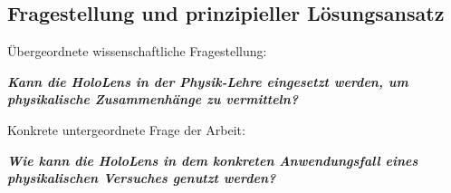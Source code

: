 \begin{comment}
Nicht zuletzt durch leistungsstärkere Hardware und Fortschritte im Bereich der künstlichen Intelligenz haben Augemented und Virtual Reality in den letzten Jahren an Bedeutung gewonnen.
\\
Physikalische Experimente durch virtuelle Darstellungen anzureichern und so besser und intuitiver verständlich zu machen, ist kein völlig neuer Ansatz. So stellen Strzys et. al. eine Anwendung mit der HoloLens im Bereich der Thermodynamik vor, bei der das gemessene Wärmeprofil eines erhitzten Metallstabes virtuell mit Hilfe der HoloLens auf den Stab gelegt wird \cite{Strzys17}. Und Buchau et. al. präsentieren eine Lösung, die unter anderem das Magnetfeld zweier Helmholtz-Spulen in das Echtzeitbild der Webcam zeichnet \cite{Buchau09}.\\ 
\end{comment}

\subsection{Fragestellung und prinzipieller Lösungsansatz}
\label{sec-1-2}
Übergeordnete wissenschaftliche Fragestellung:
\begin{center}
	\textit{\textbf{Kann die HoloLens in der Physik-Lehre eingesetzt werden, um physikalische Zusammenhänge zu vermitteln?}}
\end{center}

Konkrete untergeordnete Frage der Arbeit:
\begin{center}
	\textit{\textbf{Wie kann die HoloLens in dem konkreten Anwendungsfall eines physikalischen Versuches genutzt werden?}}
\end{center}

